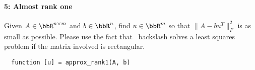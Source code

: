 \documentclass[12pt, leqno]{article}
\begin{document}
\paragraph*{5: Almost rank one}
Given $A \in \bbR^{n \times m}$ and $b \in \bbR^n$, find $u \in \bbR^m$
so that $\|A-bu^T\|_F^2$ is as small as possible.  Please use the fact
that \matlab\ backslash solves a least squares problem if the matrix
involved is rectangular.
\begin{lstlisting}
  function [u] = approx_rank1(A, b)
\end{lstlisting}
\end{document}
